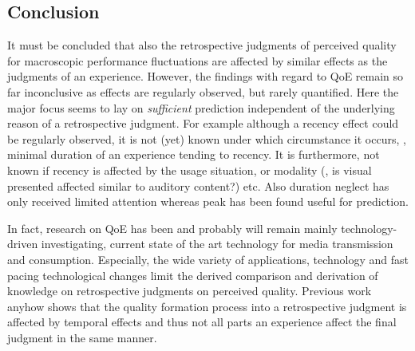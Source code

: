 \subsection{Conclusion}
It must be concluded that also the retrospective judgments of perceived quality for macroscopic performance fluctuations are affected by similar effects as the judgments of an experience.
However, the findings with regard to \ac{QoE} remain so far inconclusive as effects are regularly observed, but rarely quantified.
Here the major focus seems to lay on \emph{sufficient} prediction independent of the underlying reason of a retrospective judgment.
For example although a recency effect could be regularly observed, it is not (yet) known under which circumstance it occurs, \eg, minimal duration of an experience tending to recency.
It is furthermore, not known if recency is affected by the usage situation, or modality (\eg, is visual presented affected similar to auditory content?) etc.
Also duration neglect has only received limited attention whereas peak has been found useful for prediction.

In fact, research on \ac{QoE} has been and probably will remain mainly technology-driven investigating, current state of the art technology for media transmission and consumption.
Especially, the wide variety of applications, technology and fast pacing technological changes limit the derived comparison and derivation of knowledge on retrospective judgments on perceived quality.
Previous work anyhow shows that the quality formation process into a retrospective judgment is affected by temporal effects and thus not all parts an experience affect the final judgment in the same manner.